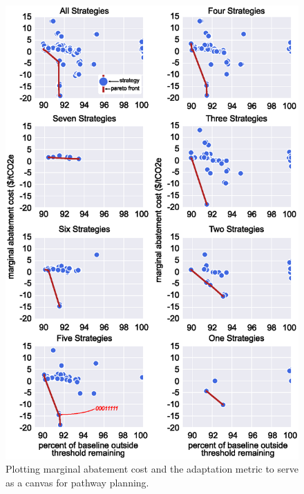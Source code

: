 \documentclass[twocolumn, a4paper,10pt]{article}
\begin{document}
\begin{figure}[t]
    \centering
    \captionsetup{margin=.5cm}
    \includegraphics[scale=0.50]{figures/pareto_plots_585_box.eps}
    \caption{Plotting marginal abatement cost and the adaptation metric to serve as a canvas for pathway planning.}
    \label{fig:pareto_plot}
\end{figure}

\end{document}
